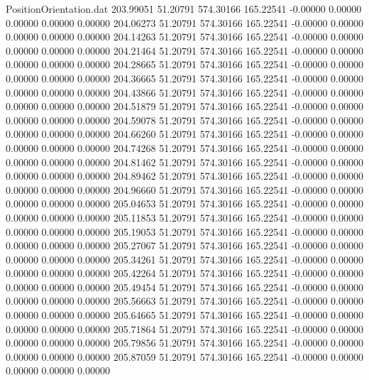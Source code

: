 \begin{filecontents}{PositionOrientation.dat}
 203.99051   51.20791  574.30166   165.22541   -0.00000    0.00000    0.00000    0.00000    0.00000
 204.06273   51.20791  574.30166   165.22541   -0.00000    0.00000    0.00000    0.00000    0.00000
 204.14263   51.20791  574.30166   165.22541   -0.00000    0.00000    0.00000    0.00000    0.00000
 204.21464   51.20791  574.30166   165.22541   -0.00000    0.00000    0.00000    0.00000    0.00000
 204.28665   51.20791  574.30166   165.22541   -0.00000    0.00000    0.00000    0.00000    0.00000
 204.36665   51.20791  574.30166   165.22541   -0.00000    0.00000    0.00000    0.00000    0.00000
 204.43866   51.20791  574.30166   165.22541   -0.00000    0.00000    0.00000    0.00000    0.00000
 204.51879   51.20791  574.30166   165.22541   -0.00000    0.00000    0.00000    0.00000    0.00000
 204.59078   51.20791  574.30166   165.22541   -0.00000    0.00000    0.00000    0.00000    0.00000
 204.66260   51.20791  574.30166   165.22541   -0.00000    0.00000    0.00000    0.00000    0.00000
 204.74268   51.20791  574.30166   165.22541   -0.00000    0.00000    0.00000    0.00000    0.00000
 204.81462   51.20791  574.30166   165.22541   -0.00000    0.00000    0.00000    0.00000    0.00000
 204.89462   51.20791  574.30166   165.22541   -0.00000    0.00000    0.00000    0.00000    0.00000
 204.96660   51.20791  574.30166   165.22541   -0.00000    0.00000    0.00000    0.00000    0.00000
 205.04653   51.20791  574.30166   165.22541   -0.00000    0.00000    0.00000    0.00000    0.00000
 205.11853   51.20791  574.30166   165.22541   -0.00000    0.00000    0.00000    0.00000    0.00000
 205.19053   51.20791  574.30166   165.22541   -0.00000    0.00000    0.00000    0.00000    0.00000
 205.27067   51.20791  574.30166   165.22541   -0.00000    0.00000    0.00000    0.00000    0.00000
 205.34261   51.20791  574.30166   165.22541   -0.00000    0.00000    0.00000    0.00000    0.00000
 205.42264   51.20791  574.30166   165.22541   -0.00000    0.00000    0.00000    0.00000    0.00000
 205.49454   51.20791  574.30166   165.22541   -0.00000    0.00000    0.00000    0.00000    0.00000
 205.56663   51.20791  574.30166   165.22541   -0.00000    0.00000    0.00000    0.00000    0.00000
 205.64665   51.20791  574.30166   165.22541   -0.00000    0.00000    0.00000    0.00000    0.00000
 205.71864   51.20791  574.30166   165.22541   -0.00000    0.00000    0.00000    0.00000    0.00000
 205.79856   51.20791  574.30166   165.22541   -0.00000    0.00000    0.00000    0.00000    0.00000
 205.87059   51.20791  574.30166   165.22541   -0.00000    0.00000    0.00000    0.00000    0.00000

\end{filecontents}

